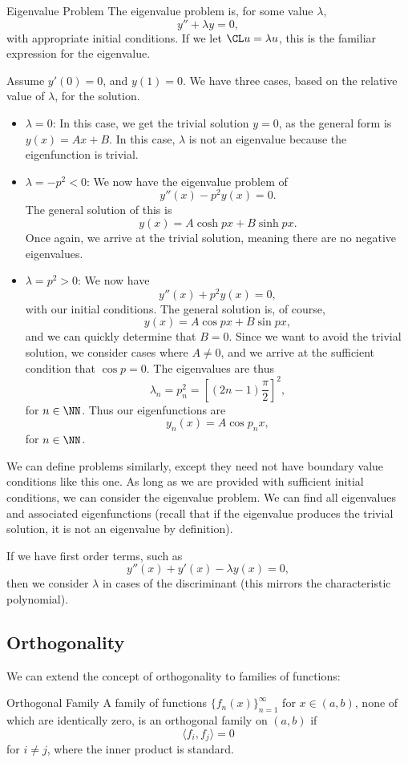\begin{definition}{Eigenvalue Problem}{}
The eigenvalue problem is, for some value $\lambda$, 
\[ y'' + \lambda y = 0, \] with appropriate initial conditions. If we let $\CL u = \lambda u$, this is the familiar expression for the eigenvalue. 
\end{definition}
Assume $y'(0) = 0$, and $y(1) = 0$. 
We have three cases, based on the relative value of $\lambda$, for the solution. 
\begin{itemize}
\item $\lambda = 0$: In this case, we get the trivial solution $y = 0$, as the general form is $y(x) = Ax + B$. In this case, $\lambda$ is not an eigenvalue because the eigenfunction is trivial. 
\item $\lambda = -p^2 < 0$: We now have the eigenvalue problem of 
\[ y''(x) - p^2y(x) = 0. \] The general solution of this is 
\[ y(x) = A\cosh{px} + B\sinh{px}. \] Once again, we arrive at the trivial solution, meaning there are no negative eigenvalues. 
\item $\lambda = p^2 > 0$: We now have 
\[ y''(x) + p^2y(x) = 0, \] with our initial conditions. The general solution is, of course, 
\[ y(x) = A\cos{px} + B\sin{px}, \] and we can quickly determine that $B = 0$. Since we want to avoid the trivial solution, we consider cases where $A\neq 0$, and we arrive at the sufficient condition that $\cos{p} = 0$. The eigenvalues are thus 
\[ \lambda_n = p^2_n = \left[ (2n-1)\frac{\pi}{2} \right]^2, \] for $n \in \NN$. Thus our eigenfunctions are 
\[ y_n(x) = A\cos{p_n x}, \] for $n \in \NN$. 
\end{itemize}

We can define problems similarly, except they need not have boundary value conditions like this one. As long as we are provided with sufficient initial conditions, we can consider the eigenvalue problem. We can find all eigenvalues and associated eigenfunctions (recall that if the eigenvalue produces the trivial solution, it is not an eigenvalue by definition). 

If we have first order terms, such as 
\[ y''(x) + y'(x) - \lambda y(x) = 0, \] then we consider $\lambda$ in cases of the discriminant (this mirrors the characteristic polynomial). 

\subsection{Orthogonality}

We can extend the concept of orthogonality to families of functions: 
\begin{definition}{Orthogonal Family}{}
A family of functions $\{f_n(x)\}^\infty_{n=1}$ for $x \in (a,b)$, none of which are identically zero, is an orthogonal family on $(a,b)$ if 
\[ \langle f_i, f_j \rangle = 0 \] for $i \neq j$, where the inner product is standard. 
\end{definition}

